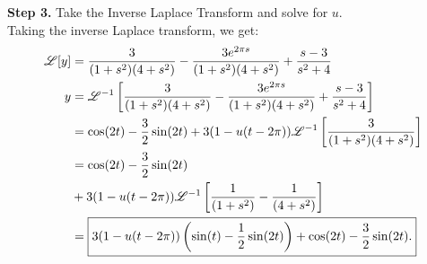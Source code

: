 \documentclass[11pt]{article}
\begin{document}
    \begin{solution}
        \textbf{Step 3.} Take the Inverse Laplace Transform and solve for $u$. \\
        Taking the inverse Laplace transform, we get:
        \begin{align}
            \mathscr L[y] &= \dfrac{3}{(1+s^2)(4+s^2)} - \dfrac{3e^{2\pi s}}{(1+s^2)(4+s^2)}+ \dfrac{s-3}{s^2+4} \\
            y&= \mathscr L^{-1} \left[\dfrac{3}{(1+s^2)(4+s^2)} - \dfrac{3e^{2\pi s}}{(1+s^2)(4+s^2)}+ \dfrac{s-3}{s^2+4}\right] \\
            &= \cos(2t) - \dfrac{3}{2}\sin(2t) + 3(1-u(t-2\pi))\mathscr L^{-1} \left[\dfrac{3}{(1+s^2)(4+s^2)} \right] \\
            &= \cos(2t) - \dfrac{3}{2}\sin(2t) \\
            &+ 3(1-u(t-2\pi))\mathscr L^{-1} \left[\dfrac{1}{(1+s^2)}-\dfrac{1}{(4+s^2)} \right] \\
            &= \boxed{3(1-u(t-2\pi))\left(\sin(t)-\dfrac{1}{2}\sin(2t)\right) + \cos(2t) - \dfrac{3}{2}\sin(2t).}
        \end{align}
    \end{solution}
\end{document}
